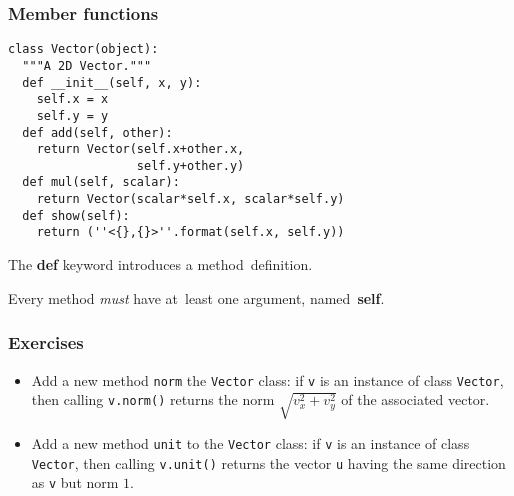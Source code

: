 \begin{frame}[fragile]\frametitle{Member functions}
\begin{lstlisting}
class Vector(object):
  """A 2D Vector."""
  def __init__(self, x, y):
    self.x = x
    self.y = y
  def add(self, other):
    return Vector(self.x+other.x,
                  self.y+other.y)
  def mul(self, scalar):
    return Vector(scalar*self.x, scalar*self.y)
  def show(self):
    return (''<{},{}>''.format(self.x, self.y))
\end{lstlisting}
      The {\bf def} keyword introduces a method~definition.

      
      Every method \emph{must} have at~least one argument,
      named~{\bf self}.
\end{frame}

\begin{frame}[fragile]\frametitle{Exercises}
\begin{itemize}
\item Add a new method \texttt{norm} the \texttt{Vector} class: if
    \texttt{v} is an instance of class \texttt{Vector}, then calling
    \texttt{v.norm()} returns the norm $\sqrt{v_x^2 + v_y^2}$ of
    the associated vector.
\item 
    Add a new method \texttt{unit} to the \texttt{Vector} class: if
    \texttt{v} is an instance of class \texttt{Vector}, then calling
    \texttt{v.unit()} returns the vector \texttt{u} having the
    same direction as \texttt{v} but norm $1$.
\end{itemize}
\end{frame}


